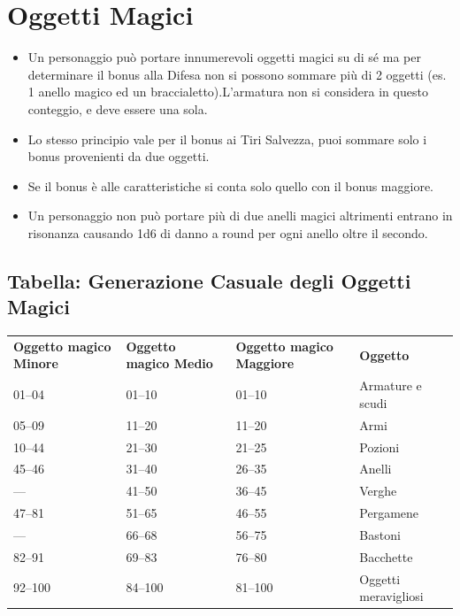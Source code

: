 \documentclass[a4paper,11pt,twoside,openany]{book}
\begin{document}
\pagebreak

\section{Oggetti Magici}

\label{oggetti-magici}
\begin{itemize}
	\item
	      Un personaggio può portare innumerevoli oggetti magici su di sé ma per determinare il bonus alla Difesa non si possono sommare più di 2 oggetti (es. 1 anello magico ed un braccialetto).L'armatura non si considera in questo conteggio, e deve essere una sola.
	\item
	      Lo stesso principio vale per il bonus ai Tiri Salvezza, puoi sommare solo i bonus provenienti da due oggetti.
	\item
	      Se il bonus è alle caratteristiche si conta solo quello con il bonus maggiore.
	\item
	      Un personaggio non può portare più di due anelli magici altrimenti
	      entrano in risonanza causando 1d6 di danno a round per ogni anello oltre il secondo.
\end{itemize}



\subsection{Tabella: Generazione Casuale degli Oggetti Magici}

\label{tabella-generazione-casuale-degli-oggetti-magici}

\begin{tabular}{llll}
	\toprule
	\textbf{Oggetto magico Minore} & \textbf{ Oggetto magico Medio} & \textbf{Oggetto magico Maggiore} & \textbf{Oggetto}    \\
	01--04         & 01--10         & 01--10           & Armature e scudi\\
	05--09         & 11--20         & 11--20           & Armi\\
	10--44         & 21--30         & 21--25           & Pozioni\\
	45--46         & 31--40         & 26--35           & Anelli\\
	---            & 41--50         & 36--45           & Verghe\\
	47--81         & 51--65         & 46--55           & Pergamene\\
	---            & 66--68         & 56--75           & Bastoni\\
	82--91         & 69--83         & 76--80           & Bacchette\\
	92--100        & 84--100        & 81--100          & Oggetti meravigliosi\\
\end{tabular}
\end{document}
